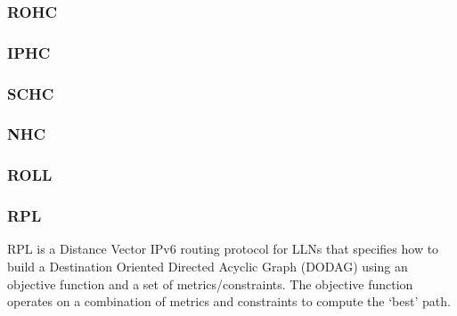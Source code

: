 \subsubsection{ROHC}
\subsubsection{IPHC}
\subsubsection{SCHC}

\subsubsection{NHC}
\subsubsection{ROLL}

\subsubsection{RPL}
RPL is a Distance Vector IPv6 routing protocol for LLNs that specifies how to build a Destination Oriented Directed Acyclic Graph (DODAG) using an objective function and a set of metrics/constraints.
The objective function operates on a combination of metrics and constraints to compute the ‘best’ path.

